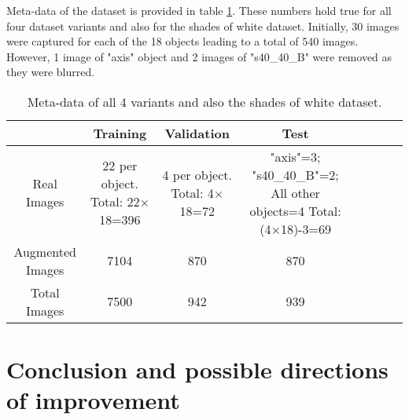 \documentclass[paper=a4,11pt,parskip=half,toc=listof]{scrartcl}
\begin{document}
Meta-data of the dataset is provided in table \ref{Table:meta}. These numbers hold true for all four dataset variants and also for the shades of white dataset. Initially, 30 images were captured for each of the 18 objects leading to a total of 540 images. However, 1 image of "axis" object and 2 images of "s40\_40\_B" were removed as they were blurred.

\begin{table}[!htb]
	\centering
	\begin{tabular}{|c|c|c|c|c|c|c|c|}
	\hline 
    & Training & Validation & Test \\ 
	\hline 
	Real Images & \makecell{22 per object.\\ Total: 22$\times$18=396} & \makecell{4 per object.\\ Total: 4$\times$18=72} & 				\makecell{"axis"=3; \\"s40\_40\_B"=2; \\All other objects=4\\ Total: (4$\times$18)-3=69} \\ 
	\hline 
	Augmented Images & 7104 & 870 & 870 \\ 
	\hline 
	Total Images & 7500 & 942 & 939 \\ 
	\hline 
	\end{tabular}
	\caption{Meta-data of all 4 variants and also the shades of white dataset.} 
	\label{Table:meta}
\end{table}

\section{Conclusion and possible directions of improvement}
\end{document}
